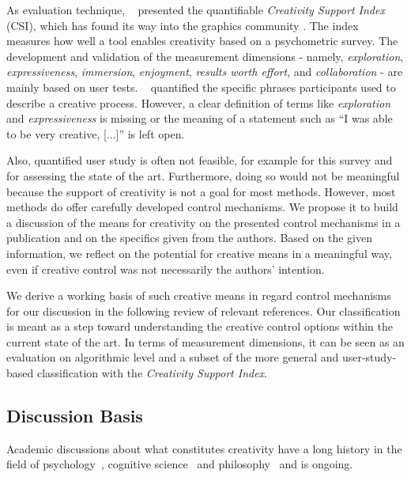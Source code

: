 As evaluation technique, \citeauthor*{cherry_2014_qcs}~\cite{cherry_2014_qcs} presented the quantifiable \textit{Creativity Support Index} (CSI), which has found its way into the graphics community \cite{shugrina_2017_ppi}. The index measures how well a tool enables creativity based on a psychometric survey. The development and validation of the measurement dimensions - namely, \textit{exploration}, \textit{expressiveness}, \textit{immersion}, \textit{enjoyment}, \textit{results worth effort}, and \textit{collaboration} - are mainly based on user tests. \citeauthor*{cherry_2014_qcs}~\cite{cherry_2014_qcs} quantified the specific phrases participants used to describe a creative process. However, a clear definition of terms like \textit{exploration} and \textit{expressiveness} is missing or the meaning of a statement such as ``I was able to be very creative, [...]'' is left open. 

Also, quantified user study is often not feasible, for example for this survey and for assessing the state of the art. Furthermore, doing so would not be meaningful because the support of creativity is not a goal for most methods. However, most methods do offer carefully developed control mechanisms. We propose it to build a discussion of the means for creativity on the presented control mechanisms in a publication and on the specifics given from the authors. Based on the given information, we reflect on the potential for creative means in a meaningful way, even if creative control was not necessarily the authors' intention. 

We derive a working basis of such creative means in regard control mechanisms for our discussion in the following review of relevant references. Our classification is meant as a step toward understanding the creative control options within the current state of the art. In terms of measurement dimensions, it can be seen as an evaluation on algorithmic level and a subset of the more general and user-study-based classification with the \textit{Creativity Support Index}. 

\subsection{Discussion Basis}
\label{subsec:creative_means}

Academic discussions about what constitutes creativity have a long history in the field of psychology~\cite{weisberg_2006_cui}, cognitive science~\cite{boden_2004_cmm} and philosophy~\cite{gaut_2010_pc} and is ongoing. 

